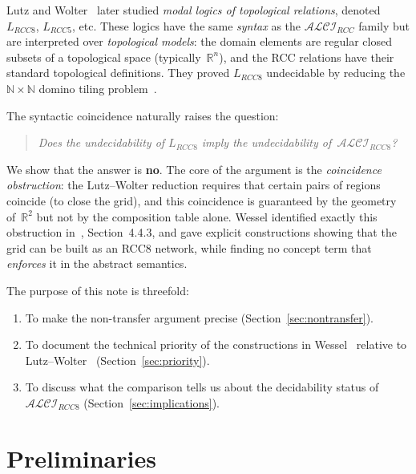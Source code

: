\documentclass[11pt]{article}
\newcommand{\ALCIRCC}[1]{\ensuremath{\mathcal{ALCI}_{\mathit{RCC#1}}}}
\newcommand{\LRCC}[1]{\ensuremath{L_{\mathit{RCC#1}}}}
\newcommand{\reals}{\mathbb{R}}
\newcommand{\naturals}{\mathbb{N}}
\begin{document}
Lutz and Wolter~\cite{LutzWolter2006} later studied \emph{modal
logics of topological relations}, denoted $\LRCC{8}$, $\LRCC{5}$, etc.  These
logics have the same \emph{syntax} as the $\ALCIRCC{}$ family but are
interpreted over \emph{topological models}: the domain elements are regular
closed subsets of a topological space (typically~$\reals^n$), and the RCC
relations have their standard topological definitions.  They proved $\LRCC{8}$
undecidable by reducing the $\naturals\times\naturals$ domino tiling
problem~\cite{LutzWolter2006}.

The syntactic coincidence naturally raises the question:

\begin{quote}
\emph{Does the undecidability of $\LRCC{8}$ imply the undecidability
of~$\ALCIRCC{8}$?}
\end{quote}

We show that the answer is \textbf{no}.  The core of the argument is the
\emph{coincidence obstruction}: the Lutz--Wolter reduction requires that
certain pairs of regions coincide (to close the grid), and this coincidence is
guaranteed by the geometry of~$\reals^2$ but not by the composition table
alone.  Wessel identified exactly this obstruction in~\cite{Wessel2003},
Section~4.4.3, and gave explicit constructions showing that the grid can be
built as an RCC8 network, while finding no concept term that \emph{enforces} it
in the abstract semantics.

The purpose of this note is threefold:
\begin{enumerate}
  \item To make the non-transfer argument precise (Section~\ref{sec:nontransfer}).
  \item To document the technical priority of the constructions in
    Wessel~\cite{Wessel2003} relative to Lutz--Wolter~\cite{LutzWolter2006}
    (Section~\ref{sec:priority}).
  \item To discuss what the comparison tells us about the decidability status of
    $\ALCIRCC{8}$ (Section~\ref{sec:implications}).
\end{enumerate}

\section{Preliminaries}
\label{sec:prelim}
\end{document}
